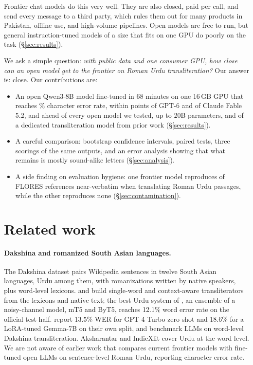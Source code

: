 \documentclass[11pt]{article}
\begin{document}
Frontier chat models do this very well. They are also closed, paid per call, and send every message to a third party, which rules them out for many products in Pakistan, offline use, and high-volume pipelines. Open models are free to run, but general instruction-tuned models of a size that fits on one GPU do poorly on the task (\S\ref{sec:results}).

We ask a simple question: \emph{with public data and one consumer GPU, how close can an open model get to the frontier on Roman Urdu transliteration?} Our answer is: close. Our contributions are:
\begin{itemize}
\item An open Qwen3-8B model fine-tuned in 68 minutes on one 16\,GB GPU that reaches \OursCER\% character error rate, within \GapGpt points of GPT-6 and \GapFront of Claude Fable 5.2, and ahead of every open model we tested, up to 20B parameters, and of a dedicated transliteration model from prior work (\S\ref{sec:results}).
\item A careful comparison: bootstrap confidence intervals, paired tests, three scorings of the same outputs, and an error analysis showing that what remains is mostly sound-alike letters (\S\ref{sec:analysis}).
\item A side finding on evaluation hygiene: one frontier model reproduces \ContFableNinety of \ContNTr FLORES references near-verbatim when translating Roman Urdu passages, while the other reproduces none (\S\ref{sec:contamination}).
\end{itemize}

\section{Related work}

\paragraph{Dakshina and romanized South Asian languages.} The Dakshina dataset \citep{roark2020dakshina} pairs Wikipedia sentences in twelve South Asian languages, Urdu among them, with romanizations written by native speakers, plus word-level lexicons. \citet{roark2020dakshina} and \citet{kirov2024context} build single-word and context-aware transliterators from the lexicons and native text; the best Urdu system of \citet{kirov2024context}, an ensemble of a noisy-channel model, mT5 and ByT5, reaches 12.1\% word error rate on the official test half. \citet{alam2025normalizer} report 13.5\% WER for GPT-4 Turbo zero-shot and 18.6\% for a LoRA-tuned Gemma-7B on their own split, and \citet{azam2025beyond} benchmark LLMs on word-level Dakshina transliteration. Aksharantar and IndicXlit \citep{madhani2023aksharantar} cover Urdu at the word level. We are not aware of earlier work that compares current frontier models with fine-tuned open LLMs on sentence-level Roman Urdu, reporting character error rate.
\end{document}
